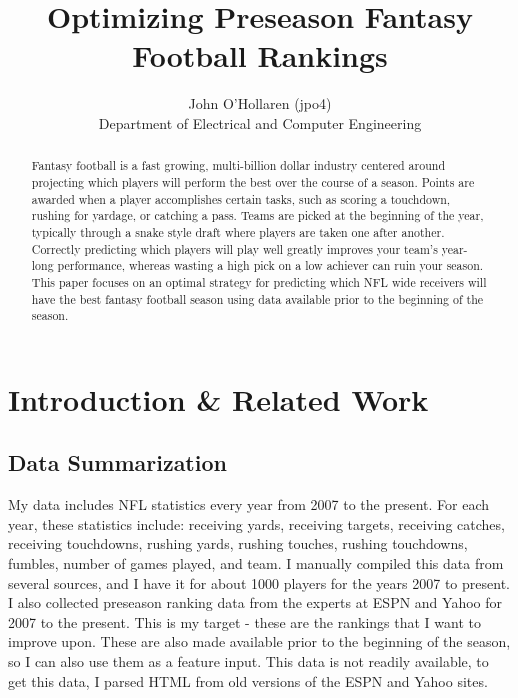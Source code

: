 \documentclass{article} %
\title{Optimizing Preseason Fantasy Football Rankings}
\author{
John O'Hollaren (jpo4) \\
Department of Electrical and Computer Engineering\\
}
\begin{document}
\maketitle


\begin{abstract}
Fantasy football is a fast growing, multi-billion dollar industry centered around projecting which players will perform the best over the course of a season. Points are awarded when a player accomplishes certain tasks, such as scoring a touchdown, rushing for yardage, or catching a pass. Teams are picked at the beginning of the year, typically through a snake style draft where players are taken one after another. Correctly predicting which players will play well greatly improves your team's year-long performance, whereas wasting a high pick on a low achiever can ruin your season. This paper focuses on an optimal strategy for predicting which NFL wide receivers will have the best fantasy football season using data available prior to the beginning of the season.
\end{abstract}


\section{Introduction \& Related Work}

\subsection{Data Summarization}

My data includes NFL statistics every year from 2007 to the present. For each year, these statistics include: receiving yards, receiving targets, receiving catches, receiving touchdowns, rushing yards, rushing touches, rushing touchdowns, fumbles, number of games played, and team. I manually compiled this data from several sources, and I have it for about 1000 players for the years 2007 to present. \\

I also collected preseason ranking data from the experts at ESPN and Yahoo for 2007 to the present. This is my target - these are the rankings that I want to improve upon. These are also made available prior to the beginning of the season, so I can also use them as a feature input. This data is not readily available, to get this data, I parsed HTML from old versions of the ESPN and Yahoo sites.
\end{document}

